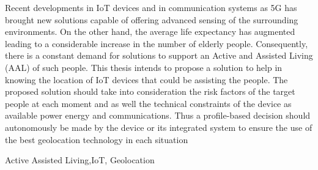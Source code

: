    
   


 Recent developments in IoT devices and in communication systems as 5G has brought new solutions capable of offering advanced sensing of the surrounding environments. On the other hand, the average life expectancy has augmented leading to a considerable increase in the number of elderly people. Consequently, there is a constant demand for solutions to support an Active and Assisted Living (AAL) of such people. This thesis intends to propose a solution to help in knowing the location of IoT devices that could be assisting the people. The proposed solution should take into consideration the risk factors of the target people at each moment and as well the technical constraints of the device as available power energy and communications. Thus a profile-based decision should autonomously be made by the device or its integrated system to ensure the use of the best geolocation technology in each situation


\begin{keywords}
Active Assisted Living,IoT, Geolocation
\end{keywords} 
